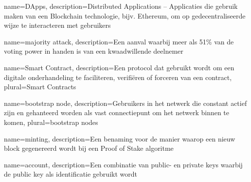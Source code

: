 

 {
  name={DApps},
  description={Distributed Applications -- Applicaties die gebruik maken van een Blockchain technologie, bijv. Ethereum, om op gedecentraliseerde wijze te interacteren met gebruikers}
}

 {
  name={majority attack},
  description={Een aanval waarbij meer als 51\% van de voting power in handen is van een kwaadwillende deelnemer}
}

 {
  name={Smart Contract},
  description={Een protocol dat gebruikt wordt om een digitale onderhandeling te faciliteren, verifiëren of forceren van een contract},
  plural={Smart Contracts}
}




 {
  name={bootstrap node},
  description={Gebruikers in het netwerk die constant actief zijn en gehanteerd worden als vast connectiepunt om het netwerk binnen te komen},
  plural={bootstrap nodes}
}

 {
  name={minting},
  description={Een benaming voor de manier waarop een nieuw block gegenereerd wordt bij een Proof of Stake algoritme}
}

 {
  name={account},
  description={Een combinatie van public- en private keys waarbij de public key als identificatie gebruikt wordt}
}


